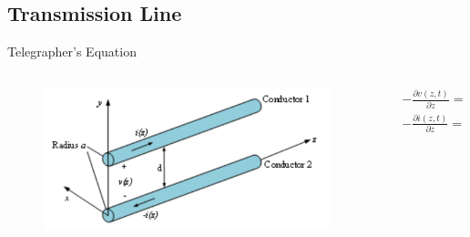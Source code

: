 \subsection{Transmission Line}
\begin{frame}{Telegrapher's Equation}
  \begin{columns}
    \begin{column}{0.45\textwidth}
      \begin{figure}
        \includegraphics[width=\textwidth]{figures/transmission}
      \end{figure}
    \end{column}
    \begin{column}{0.55\textwidth}
      \begin{align*}
        &-\frac{\partial v(z,t)}{\partial z}=\mathop{R'}i(z,t)+\mathop{L'}\frac{\partial i(z,t)}{\partial z} \\
        &-\frac{\partial i(z,t)}{\partial z}=\mathop{G'}v(z,t)+\mathop{C'}\frac{\partial v(z,t)}{\partial z} \\
      \end{align*}
    \end{column}
  \end{columns}
\end{frame}

